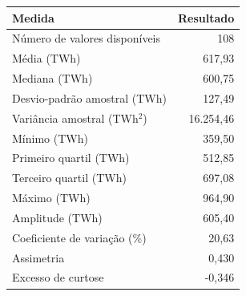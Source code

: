 \begin{tabular}{lr}
\toprule
Medida & Resultado \\
\midrule
Número de valores disponíveis & 108 \\
Média (TWh) & 617,93 \\
Mediana (TWh) & 600,75 \\
Desvio-padrão amostral (TWh) & 127,49 \\
Variância amostral (TWh$^2$) & 16.254,46 \\
Mínimo (TWh) & 359,50 \\
Primeiro quartil (TWh) & 512,85 \\
Terceiro quartil (TWh) & 697,08 \\
Máximo (TWh) & 964,90 \\
Amplitude (TWh) & 605,40 \\
Coeficiente de variação (\%) & 20,63 \\
Assimetria & 0,430 \\
Excesso de curtose & -0,346 \\
\bottomrule
\end{tabular}
